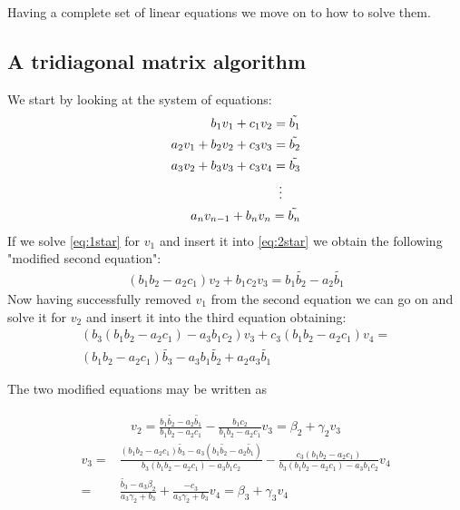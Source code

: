 \documentclass[11pt,a4paper,english,draft]{article}
\numberwithin{equation}{section}
\begin{document}
Having a complete set of linear equations we move on to how to solve them.

\subsection{A tridiagonal matrix algorithm}
\label{subsec:Thomas}

We start by looking at the system of equations:
\begin{align}
	 b_1 v_1 + c_1 v_{2} = \tilde{b_1} \label{eq:1star}\\
	 a_2 v_1 + b_2 v_2 + c_3 v_3 = \tilde{b_2} \label{eq:2star}\\
	 a_3 v_2 + b_3 v_3 + c_3 v_4 = \tilde{b_3} \label{eq:3star}\\
\nonumber\vdots \hspace{0.5cm}  \\ 
	 a_n v_{n-1} + b_n v_n = \tilde{b_n} \label{eq:Nstar}
\end{align}
If we solve \eqref{eq:1star} for $v_1$ and insert it into \eqref{eq:2star} we obtain the following "modified second equation":
\begin{align*}
	(b_1 b_2 - a_2 c_1)v_2 + b_1 c_2 v_3 = b_1 \tilde{b_2} - a_2  \tilde{b_1}  
\end{align*}
Now having successfully removed $v_1$ from the second equation we can go on and solve it for $v_2$ and insert it into the third equation obtaining:
\begin{align*}
(b_3 (b_1 b_2 - a_2 c_1)- a_3 b_1 c_2)v_3 + c_3(b_1 b_2 -a_2 c_1)v_4 = \\
(b_1 b_2 - a_2 c_1 ) \tilde{b_3} - a_3 b_1 \tilde{b_2} + a_2 a_3 \tilde{b_1} 
\end{align*}

The two modified equations may be written as 

\begin{align*}
v_2 = \frac{b_1 \tilde{b_2} - a_2 \tilde{b_1}}{b_1 b_2 - a_2 c_1} - \frac{b_1 c_2}{b_1 b_2 - a_2 c_1} v_3 = \beta_2 + \gamma_2 v_3
\end{align*}
\begin{align*}
v_3 =& \frac{(b_1 b_2 - a_2 c_1) \tilde{b_3} - a_3 (b_1 \tilde{b_2} - a_2 \tilde{b_1})}{b_3 (b_1 b_2 - a_2 c_1)- a_3 b_1 c_2} - \frac{c_3(b_1 b_2 - a_2 c_1)}{b_3 (b_1 b_2 - a_2 c_1)- a_3 b_1 c_2} v_4 \\
=&  \frac{\tilde{b_3}-a_3 \beta_2}{a_3 \gamma_2 + b_3} + \frac{-c_3}{a_3 \gamma_2 + b_3}v_4 = \beta_3 + \gamma_3 v_4
\end{align*}
\end{document}
